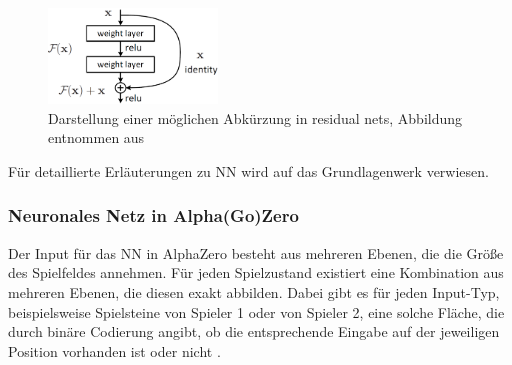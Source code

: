 \documentclass[12pt,a4paper]{article}
\begin{document}
\begin{figure}
\centering
\includegraphics[width=0.4\textwidth]{pics/res_skip_connection.png}	
\caption{Darstellung einer möglichen Abkürzung in residual nets, Abbildung entnommen aus \cite{He2016}}
\label{fig:res_skip}
\end{figure}

Für detaillierte Erläuterungen zu NN wird auf das Grundlagenwerk \cite{Goodfellow2015} verwiesen.

\subsubsection{Neuronales Netz in Alpha(Go)Zero}
Der Input für das NN in AlphaZero besteht aus mehreren Ebenen, die die Größe des Spielfeldes annehmen. Für jeden Spielzustand existiert eine Kombination aus mehreren Ebenen, die diesen exakt abbilden. Dabei gibt es für jeden Input-Typ, beispielsweise Spielsteine von Spieler 1 oder von Spieler 2, eine solche Fläche, die durch binäre Codierung angibt, ob die entsprechende Eingabe auf der jeweiligen Position vorhanden ist oder nicht \cite{SilverHubert2017}.
\end{document}
